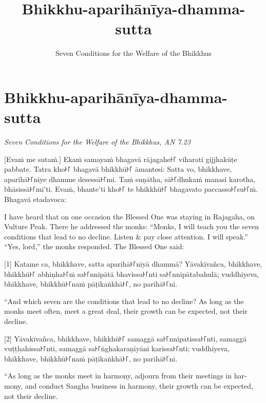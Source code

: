 \documentclass[
  babelLanguage=portuguese,
  final,
  a4Paper,
]{chantingbook}
\title{Bhikkhu-aparihānīya-dhamma-sutta}
\subtitle{Seven Conditions for the Welfare of the Bhikkhus}
\begin{document}
\mainmatter

\eveningChapterSettings

\pagestyle{empty}

\chapter{Bhikkhu-aparihānīya-dhamma-sutta}

\emph{Seven Conditions for the Welfare of the Bhikkhus, AN 7.23}

\begin{leader}
\end{leader}

[Evaṁ me sutaṁ.] Ekaṁ samayaṁ bhagavā rājagahe꜔꜒ viharati gijjhakūṭe pabbate.
Tatra kho꜔꜒ bhagavā bhikkhū꜔꜒ āmantesi: Satta vo, bhikkhave, aparihā꜔꜒niye dhamme
desessā꜔꜒mi. Taṁ suṇātha, sā꜔꜒dhukaṁ manasi karotha, bhāsissā꜔꜒mī'ti. Evaṁ, bhante'ti
kho꜔꜒ te bhikkhū꜔꜒ bhagavato paccasso꜔꜒su꜔꜒ṁ. Bhagavā etadavoca:

\begin{english}
  I have heard that on one occasion the Blessed One was staying in Rajagaha, on
  Vulture Peak. There he addressed the monks: “Monks, I will teach you the seven
  conditions that lead to no decline. Listen \& pay close attention. I will
  speak.” “Yes, lord,” the monks responded. The Blessed One said:
\end{english}

[1] Katame ca, bhikkhave, satta aparihā꜔꜒niyā dhammā? Yāvakīvañca, bhikkhave, bhikkhū꜔꜒
abhiṇha꜔꜒ṁ sa꜔꜒nnipātā bhavissa꜔꜒nti sa꜔꜒nnipātabahulā; vuddhiyeva, bhikkhave,
bhikkhū꜔꜒naṁ pāṭikaṅkhā꜔꜒, no parihā꜔꜒ni.

\begin{english}
  “And which seven are the conditions that lead to no decline? As long as the
  monks meet often, meet a great deal, their growth can be expected, not their
  decline.
\end{english}

[2] Yāvakīvañca, bhikkhave, bhikkhū꜔꜒ samaggā sa꜔꜒nnipatissa꜔꜒nti, samaggā
vuṭṭhahissa꜔꜒nti, samaggā sa꜔꜒ṅghakaraṇīyāni karissa꜔꜒nti; vuddhiyeva, bhikkhave,
bhikkhū꜔꜒naṁ pāṭikaṅkhā꜔꜒, no parihā꜔꜒ni.

\begin{english}
  “As long as the monks meet in harmony, adjourn from their meetings in harmony,
  and conduct Sangha business in harmony, their growth can be expected, not
  their decline.
\end{english}
\end{document}

